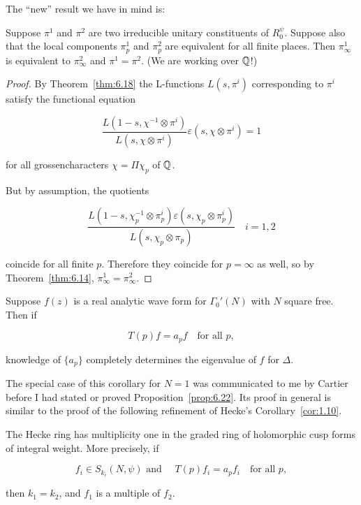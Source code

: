 The ``new'' result we have in mind is:

\begin{proposition}\label{prop:6.22}

Suppose $\pi^1$ and $\pi^2$ are two irreducible unitary constituents of $R_0^{\psi}$. Suppose also that the local components $\pi_p^1$ and $\pi_p^2$ are equivalent for all finite places. Then $\pi_{\infty}^1$ is equivalent to $\pi_{\infty}^2$ and $\pi^1 = \pi^2$. (We are working over $\mathbb{Q}$!)

\end{proposition}

\begin{proof}

By Theorem~\ref{thm:6.18} the L-functions $L(s, \pi^i)$ corresponding to $\pi^i$ satisfy the functional equation

\[
\frac{L(1 - s, \chi^{-1} \otimes \pi^i)}{L(s, \chi \otimes \pi^i)} \varepsilon(s, \chi \otimes \pi^i) = 1
\]

for all grossencharacters $\chi = \Pi\chi_p$ of $\mathbb{Q}$.

But by assumption, the quotients

\[
\frac{L(1 - s, \chi_p^{-1} \otimes \pi_p^i)\varepsilon(s, \chi_p \otimes \pi_p^i)}{L(s, \chi_p \otimes \pi_p)} \quad i = 1, 2
\]

coincide for all finite $p$. Therefore they coincide for $p = \infty$ as well, so by Theorem~\ref{thm:6.14}, $\pi_{\infty}^1 = \pi_{\infty}^2$.

\end{proof}

\begin{corollary}\label{cor:6.23}

Suppose $f(z)$ is a real analytic wave form for $\Gamma_0'(N)$ with $N$ square free. Then if

\[
T(p)f = a_p f \quad \text{for all } p,
\]

knowledge of $\{a_p\}$ completely determines the eigenvalue of $f$ for $\Delta$.

\end{corollary}

The special case of this corollary for $N = 1$ was communicated to me by Cartier before I had stated or proved Proposition~\ref{prop:6.22}. Its proof in general is similar to the proof of the following refinement of Hecke's Corollary~\ref{cor:1.10}.

\begin{theorem}\label{thm:6.24}

The Hecke ring has multiplicity one in the graded ring of holomorphic cusp forms of integral weight. More precisely, if

\[
f_i \in S_{k_i}(N, \psi) \text{ and } \quad T(p)f_i = a_p f_i \quad \text{for all } p,
\]

then $k_1 = k_2$, and $f_1$ is a multiple of $f_2$.

\end{theorem}

